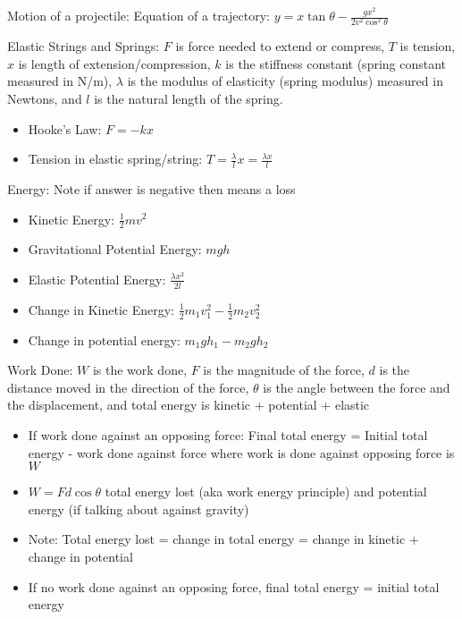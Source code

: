 \documentclass[10pt,a4paper,oneside]{book}
\begin{document}
Motion of a projectile: Equation of a trajectory: $y=x\tan\theta - \frac{gx^2}{2v^2\cos^2\theta}$

Elastic Strings and Springs: $F$ is force needed to extend or compress, $T$ is tension, $x$ is length of extension/compression, $k$ is the stiffness constant (spring constant measured in N/m), $\lambda$ is the modulus of elasticity (spring modulus) measured in Newtons, and $l$ is the natural length of the spring.
\begin{itemize}
    \item Hooke's Law: $F=-kx$
    \item Tension in elastic spring/string: $T=\frac{\lambda}{l}x=\frac{\lambda x}{l}$
\end{itemize}

Energy: Note if answer is negative then means a loss 
\begin{itemize}
    \item Kinetic Energy: $\frac{1}{2}mv^2$
    \item Gravitational Potential Energy: $mgh$
    \item Elastic Potential Energy: $\frac{\lambda x^2}{2l}$
    \item Change in Kinetic Energy: $\frac{1}{2}m_1v_1^2-\frac{1}{2}m_2v_2^2$
    \item Change in potential energy: $m_1gh_1-m_2gh_2$
\end{itemize}

Work Done: $W$ is the work done, $F$ is the magnitude of the force, $d$ is the distance moved in the direction of the force, $\theta$ is the angle between the force and the displacement, and total energy is kinetic + potential + elastic 
\begin{itemize}
    \item If work done against an opposing force: Final total energy = Initial total energy - work done against force where work is done against opposing force is $W$
    \item $W=Fd\cos\theta$ total energy lost (aka work energy principle) and potential energy (if talking about against gravity)
    \item Note: Total energy lost = change in total energy = change in kinetic + change in potential 
    \item If no work done against an opposing force, final total energy = initial total energy 
\end{itemize}
\end{document}
